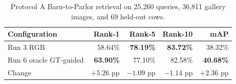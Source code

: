 \begin{table}[htbp]
\centering\small
\caption[Barn-to-Parlor Re-ID results]{Protocol A Barn-to-Parlor retrieval on 25,260 queries, 36,811 gallery images, and 69 held-out cows.}
\label{tab:reidbarn}
\begin{tabular}{lrrrr}
\toprule
Configuration & Rank-1 & Rank-5 & Rank-10 & mAP \\
\midrule
Run 3 RGB & 58.64\% & \textbf{78.19\%} & \textbf{83.72\%} & 38.32\% \\
Run 6 oracle GT-guided & \textbf{63.90\%} & 77.10\% & 82.58\% & \textbf{40.68\%} \\
Change & $+5.26$ pp & $-1.09$ pp & $-1.14$ pp & $+2.36$ pp \\
\bottomrule
\end{tabular}
\end{table}

